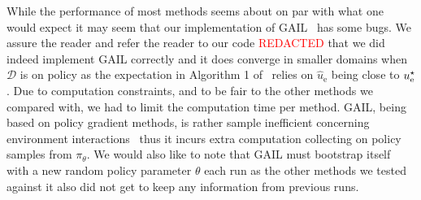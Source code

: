 \documentclass[10pt]{article}
\renewcommand{\cite}{\citep}
\theoremstyle{plain}
\theoremstyle{remark}
\begin{document}
While the performance of most methods seems about on par with what one would expect it may seem that our implementation of GAIL~\cite{Ho2016}
has some bugs. We assure the reader and refer the reader to our code \textcolor{red}{REDACTED} that we did indeed implement GAIL correctly and it does converge in smaller domains when $\mathcal{D}$ is on policy as the expectation in Algorithm 1 of~\cite{Ho2016} relies on $\hat{u}_{\mathrm{e}}$ being close to $u_{\mathrm{e}}^{\mathnormal{\star}}$. Due to computation constraints, and to be fair to the other methods we compared with, we had to limit the computation time per method. GAIL, being based on policy gradient methods, is rather sample inefficient concerning environment interactions~\cite[Section 7]{Ho2016} thus it incurs extra computation collecting on policy samples from $\pi_\theta$. We would also like to note that GAIL must bootstrap itself with a new random policy parameter $\theta$ each run as the other methods we tested against it also did not get to keep any information from previous runs.
    
    
    
    
    
\end{document}
